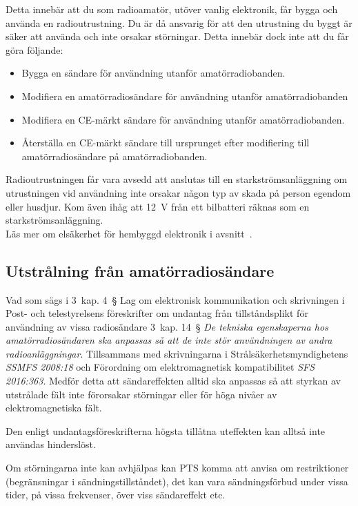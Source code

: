 Detta innebär att du som radioamatör, utöver vanlig elektronik, får bygga
och använda en radioutrustning.
Du är då ansvarig för att den utrustning du byggt är säker att använda och inte
orsakar störningar.
Detta innebär dock inte att du får göra följande:

\begin{itemize}
	\item Bygga en sändare för användning utanför amatörradiobanden.
	\item Modifiera en amatörradiosändare för användning utanför amatörradiobanden
	\item Modifiera en CE-märkt sändare för användning utanför amatörradiobanden.
	\item Återställa en CE-märkt sändare till ursprunget efter modifiering till
	amatörradiosändare på amatörradiobanden.
\end{itemize}

Radioutrustningen får vara avsedd att anslutas till en starkströmsanläggning
om utrustningen vid användning inte orsakar någon typ av skada på person
egendom eller husdjur.
Kom även ihåg att \qty{12}{\volt} från ett bilbatteri räknas som en
starkströmsanläggning.\\

Läs mer om elsäkerhet för hembyggd elektronik i
avsnitt~.

\subsection{Utstrålning från amatörradiosändare}

Vad som sägs i 3~kap. 4~\S{} Lag om elektronisk kommunikation och skrivningen i
Post- och telestyrelsens föreskrifter om undantag från tillståndsplikt för
användning av vissa radiosändare 3~kap. 14~\S{} \emph{De tekniska egenskaperna hos
	amatörradiosändaren ska anpassas så att de inte stör användningen av andra
	radioanläggningar}.
Tillsammans med skrivningarna i Strålsäkerhetsmyndighetens \emph{SSMFS 2008:18}
och Förordning om elektromagnetisk kompatibilitet \emph{SFS 2016:363}.
Medför detta att sändareffekten alltid ska anpassas så att styrkan av utstrålade
fält inte förorsakar störningar eller för höga nivåer av elektromagnetiska fält.

Den enligt undantagsföreskrifterna högsta tillåtna uteffekten kan alltså inte
användas hinderslöst.

Om störningarna inte kan avhjälpas kan PTS komma att anvisa om restriktioner
(begränsningar i sändningstillståndet), det kan vara sändningsförbud under
vissa tider, på vissa frekvenser, över viss sändareffekt etc.

